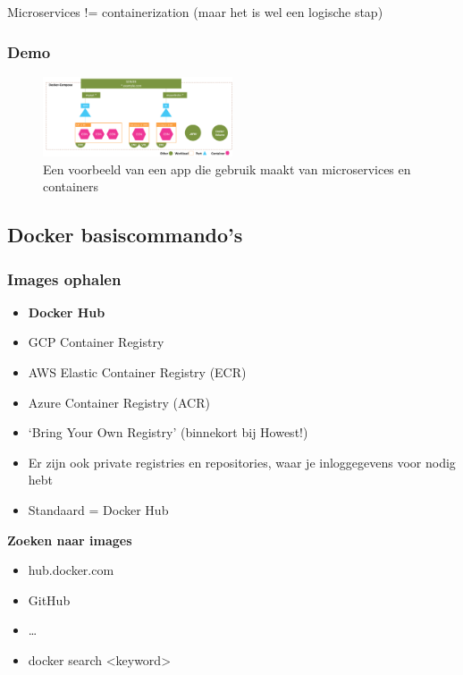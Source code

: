 \documentclass{article}
\begin{document}
Microservices != containerization (maar het is wel een logische stap)

\subsubsection{Demo}

\begin{figure}[H]
    \centering
    \includegraphics[width=0.5\textwidth]{microservices-demo.png}
    \caption{Een voorbeeld van een app die gebruik maakt van microservices en containers}
\end{figure}

\subsection{Docker basiscommando's}

\subsubsection{Images ophalen}

\begin{itemize}
    \item \textbf{Docker Hub}
    \item GCP Container Registry
    \item AWS Elastic Container Registry (ECR)
    \item Azure Container Registry (ACR)
    \item `Bring Your Own Registry' (binnekort bij Howest!)
    \item Er zijn ook private registries en repositories, waar je inloggegevens voor nodig hebt
    \item Standaard = Docker Hub
\end{itemize}

\textbf{Zoeken naar images}

\begin{itemize}
    \item hub.docker.com
    \item GitHub
    \item \dots
    \item docker search <keyword>
\end{itemize}
\end{document}
